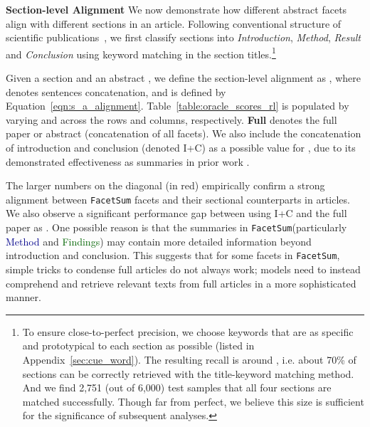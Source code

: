 \documentclass[11pt,a4paper]{article}
\newcommand{\ours}{\texttt{FacetSum}\xspace}
\newcommand{\absm}{\textcolor{darkblue}{Method}\xspace}
\newcommand{\absf}{\textcolor{darkgreen}{Findings}\xspace}
\begin{document}
\noindent\textbf{Section-level Alignment}\quad
We now demonstrate how different abstract facets align with different sections in an article.
Following conventional structure of scientific publications~\cite{suppe1998structure,rosenfeldt2000write}, we first classify sections into \textit{Introduction}, \textit{Method}, \textit{Result} and \textit{Conclusion} using keyword matching in the section titles.\footnote{
To ensure close-to-perfect precision, we choose keywords that are as specific and prototypical to each section as possible (listed in Appendix~\ref{sec:cue_word}).
The resulting recall is around , i.e. about 70\% of sections can be correctly retrieved with the title-keyword matching method. And we find 2,751 (out of 6,000) test samples that all four sections are matched successfully.
Though far from perfect, we believe this size is sufficient for the significance of subsequent analyses.}


Given a section  and an abstract , we define the section-level alignment  as ,
where  denotes sentences concatenation, and  is defined by Equation~\eqref{eqn:s_a_alignment}.
Table~\ref{table:oracle_scores_rl} is populated by varying  and  across the rows and columns, respectively.
\textbf{Full} denotes the full paper or abstract (concatenation of all facets). 
We also include the concatenation of introduction and conclusion (denoted I+C) as a possible value for , due to its demonstrated effectiveness as summaries in prior work \cite{cachola2020tldr}.

The larger numbers on the diagonal (in red) empirically confirm a strong alignment between \ours facets and their sectional counterparts in articles.
We also observe a significant performance gap between using I+C and the full paper as .
One possible reason is that the summaries in \ours (particularly \absm and \absf) may contain more detailed information beyond introduction and conclusion.
This suggests that for some facets in \ours, simple tricks to condense full articles do not always work; models need to instead comprehend and retrieve relevant texts from full articles in a more sophisticated manner.
\end{document}
